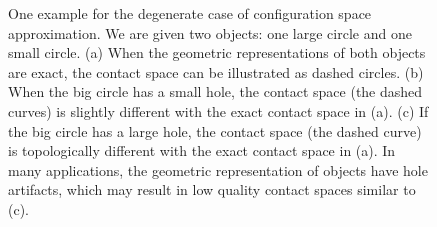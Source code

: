 \begin{figure}[!htb]
  \centering
  \caption[One example for the degenerate case of configuration space approximation]{One example for the degenerate case of configuration space approximation.
We are given two objects: one large circle and one small circle. (a) When the geometric representations of both objects are exact, the contact space can be illustrated as dashed circles. (b) When the big circle has a small hole, the contact space (the dashed curves) is slightly different with the exact contact space in (a). (c) If the big circle has a large hole, the contact space (the dashed curve) is topologically different with the exact contact space in (a). In many applications, the geometric representation of objects have hole artifacts, which may result in low quality contact spaces similar to (c). 
}\label{fig:2:hole}
\end{figure}



